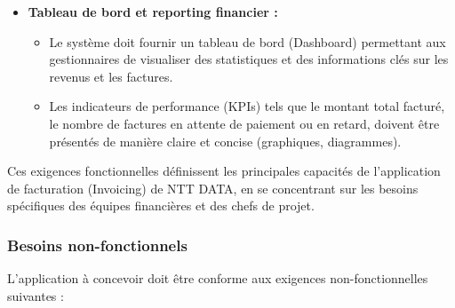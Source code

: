 \documentclass[12pt, a4paper, openany]{report}
\begin{document}
\begin{itemize}
    \vspace{-0.4cm}
    \item \textcolor{primaryBlue}{\textbf{Tableau de bord et reporting financier :}}
    \begin{itemize}
        \renewcommand{\labelitemii}{\textcolor{royalBlue}{\textbullet}}
        \setlength{\itemsep}{0.2cm}
        \vspace{0.2cm}
        
        \vspace{-0.3cm}
        \item Le système doit fournir un tableau de bord (Dashboard) permettant aux gestionnaires de visualiser des statistiques et des informations clés sur les revenus et les factures.
        \vspace{-0.3cm}
        \item Les indicateurs de performance (KPIs) tels que le montant total facturé, le nombre de factures en attente de paiement ou en retard, doivent être présentés de manière claire et concise (graphiques, diagrammes).
    \end{itemize}
\end{itemize} 

\vspace{-0.4cm}

Ces exigences fonctionnelles définissent les principales capacités de l'application de facturation (Invoicing) de NTT DATA, en se concentrant sur les besoins spécifiques des équipes financières et des chefs de projet.

\vspace{-0.5cm}

\subsubsection{Besoins non-fonctionnels}

\vspace{-0.4cm}
L'application à concevoir doit être conforme aux exigences non-fonctionnelles suivantes :

\vspace{-0.1cm}
\end{document}
